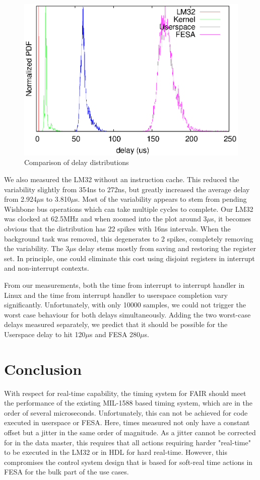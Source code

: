 \documentclass{JAC2003}
\begin{document}
\begin{figure}[t]
   \centering
   \includegraphics*[width=\columnwidth]{WEPD48f1}
   \caption{Comparison of delay distributions}
\end{figure}

We also measured the LM32 without an instruction cache.
This reduced the variability slightly from 354ns to 272ns, 
but greatly increased the average delay from 2.924$\mu$s to 3.810$\mu$s.
Most of the variability appears to stem from pending Wishbone bus operations which
can take multiple cycles to complete.
Our LM32 was clocked at 62.5MHz and when zoomed into the plot around 3$\mu$s,
it becomes obvious that the distribution has 22 spikes with 16ns intervals.
When the background task was removed, 
this degenerates to 2 spikes, 
completely removing the variability.
The 3$\mu$s delay stems mostly from saving and restoring the register set.
In principle, one could eliminate this cost using disjoint registers 
in interrupt and non-interrupt contexts.

From our measurements,
both the time from interrupt to interrupt handler in Linux 
and the time from interrupt handler to userspace completion vary significantly.
Unfortunately, with only 10000 samples, 
we could not trigger the worst case behaviour for both delays simultaneously.
Adding the two worst-case delays measured separately,
we predict that it should be possible for the Userspace delay to hit
120$\mu$s and FESA 280$\mu$s.

\section{Conclusion}
With respect for real-time capability,  the timing system for FAIR should meet the performance of the existing MIL-1588 based timing system, which are in the order of several microseconds. Unfortunately,
this can not be achieved for code executed in userspace or FESA. Here, times measured not only have a constant offset but a jitter in the same order of magnitude. As a jitter cannot be corrected for in the data master, this requires that all actions requiring harder "real-time" to be executed in the LM32 or in HDL for hard real-time. However, this compromises the control system design that is based for soft-real time actions in FESA for the bulk part of the use cases.
\end{document}
